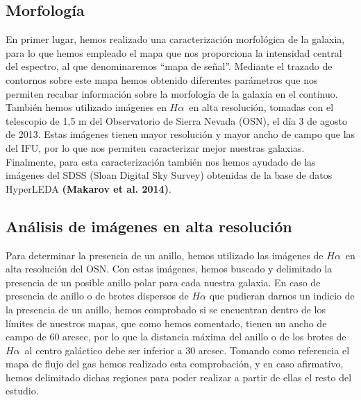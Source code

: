 \documentclass{article}
\newcommand{\hal}{$H\alpha$}
\begin{document}
\subsection{Morfología}
En primer lugar, hemos realizado una caracterización morfológica de la galaxia, para lo que hemos empleado el mapa que nos proporciona la intensidad central del espectro, al que denominaremos ``mapa de señal''. Mediante el trazado de contornos sobre este mapa hemos obtenido diferentes parámetros que nos permiten recabar información sobre la morfología de la galaxia en el continuo. También hemos utilizado imágenes en \hal\ en alta resolución, tomadas con el telescopio de 1,5 m del Observatorio de Sierra Nevada (OSN), el día 3 de agosto de 2013. Estas imágenes tienen mayor resolución y mayor ancho de campo que las del IFU, por lo que nos permiten caracterizar mejor nuestras galaxias. Finalmente, para esta caracterización también nos hemos ayudado de las imágenes del SDSS (Sloan Digital Sky Survey) obtenidas de la base de datos HyperLEDA \textbf{(Makarov et al. 2014)}.

\subsection{Análisis de imágenes en alta resolución}
Para determinar la presencia de un anillo, hemos utilizado las imágenes de \hal\ en alta resolución del OSN. Con estas imágenes, hemos buscado y delimitado la presencia de un posible anillo polar para cada nuestra galaxia. En caso de presencia de anillo o de brotes dispersos de $H\alpha$ que pudieran darnos un indicio de la presencia de un anillo, hemos comprobado si se encuentran dentro de los límites de nuestros mapas, que como hemos comentado, tienen un ancho de campo de 60 arcsec, por lo que la distancia máxima del anillo o de los brotes de \hal\ al centro galáctico debe ser inferior a 30 arcsec. Tomando como referencia el mapa de flujo del gas hemos realizado esta comprobación, y en caso afirmativo, hemos delimitado dichas regiones para poder realizar a partir de ellas el resto del estudio.
\end{document}
